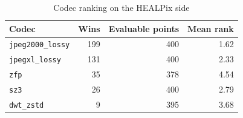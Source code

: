\begin{table}[t]
\centering
\caption{Codec ranking on the HEALPix side}
\label{tab:codec_ranking}
\footnotesize
\setlength{\tabcolsep}{3pt}
\begin{tabular}{lrrr}
\toprule
Codec & Wins & Evaluable points & Mean rank \\
\midrule
\texttt{jpeg2000\_lossy} & 199 & 400 & 1.62 \\
\texttt{jpegxl\_lossy} & 131 & 400 & 2.33 \\
\texttt{zfp} & 35 & 378 & 4.54 \\
\texttt{sz3} & 26 & 400 & 2.79 \\
\texttt{dwt\_zstd} & 9 & 395 & 3.68 \\
\bottomrule
\end{tabular}
\end{table}
